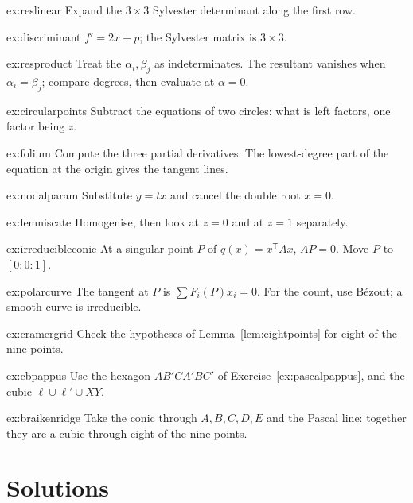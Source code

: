 \begin{hint}{ex:reslinear}
Expand the $3\times3$ Sylvester determinant along the first row.
\end{hint}
\begin{hint}{ex:discriminant}
$f'=2x+p$; the Sylvester matrix is $3\times3$.
\end{hint}
\begin{hint}{ex:resproduct}
Treat the $\alpha_i,\beta_j$ as indeterminates. The resultant vanishes when $\alpha_i=\beta_j$; compare degrees, then evaluate at $\alpha=0$.
\end{hint}
\begin{hint}{ex:circularpoints}
Subtract the equations of two circles: what is left factors, one factor being $z$.
\end{hint}
\begin{hint}{ex:folium}
Compute the three partial derivatives. The lowest-degree part of the equation at the origin gives the tangent lines.
\end{hint}
\begin{hint}{ex:nodalparam}
Substitute $y=tx$ and cancel the double root $x=0$.
\end{hint}
\begin{hint}{ex:lemniscate}
Homogenise, then look at $z=0$ and at $z=1$ separately.
\end{hint}
\begin{hint}{ex:irreducibleconic}
At a singular point $P$ of $q(x)=x^{\mathsf T}Ax$, $AP=0$. Move $P$ to $[0:0:1]$.
\end{hint}
\begin{hint}{ex:polarcurve}
The tangent at $P$ is $\sum F_i(P)x_i=0$. For the count, use B\'ezout; a smooth curve is irreducible.
\end{hint}
\begin{hint}{ex:cramergrid}
Check the hypotheses of Lemma~\ref{lem:eightpoints} for eight of the nine points.
\end{hint}
\begin{hint}{ex:cbpappus}
Use the hexagon $AB'CA'BC'$ of Exercise~\ref{ex:pascalpappus}, and the cubic $\ell\cup\ell'\cup XY$.
\end{hint}
\begin{hint}{ex:braikenridge}
Take the conic through $A,B,C,D,E$ and the Pascal line: together they are a cubic through eight of the nine points.
\end{hint}

\section{Solutions}

